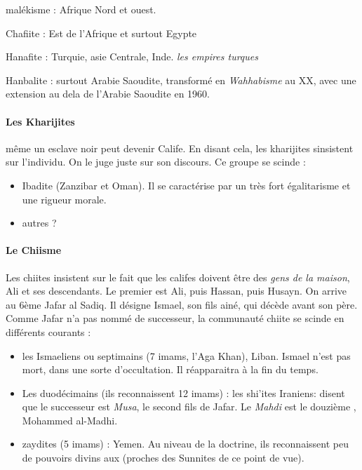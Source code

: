 \bi 
\item  malékisme : Afrique Nord et ouest.
\item Chafiite : Est de l'Afrique et surtout Egypte 
\item Hanafite : Turquie, asie Centrale, Inde. \textit{les empires turques}
\item Hanbalite : surtout Arabie Saoudite, transformé en \textit{Wahhabisme} au XX, avec une extension au dela de l'Arabie Saoudite en 1960.
\ei 

\paragraph{Les Kharijites} même un esclave noir peut devenir Calife. En disant cela, les kharijites sinsistent sur l'individu. On le juge juste sur son discours. 
Ce groupe se scinde : 
\begin{itemize}
\item Ibadite (Zanzibar et Oman). Il se caractérise par un très fort égalitarisme et une rigueur morale.
\item autres ? 
\end{itemize}

\paragraph{Le Chiisme} Les chiites insistent sur le fait que les califes doivent être des \textit{gens de la maison}, Ali et ses descendants. Le premier \imam est Ali, puis Hassan, puis Husayn. On arrive au 6ème \imam Jafar al Sadiq. Il désigne Ismael, son fils ainé, qui décède avant son père. Comme Jafar n'a pas nommé de successeur, la communauté chiite se scinde en différents courants : 
\begin{itemize}
\item les Ismaeliens ou septimains (7 imams, l'Aga Khan), Liban. Ismael n'est pas mort, dans une sorte d'occultation. Il réapparaitra à la fin du temps.  
\item Les duodécimains (ils reconnaissent 12 imams) : les shi'ites Iraniens: disent que le successeur est \textit{Musa}, le second fils de Jafar. Le \textit{Mahdi} est le douzième \imam, Mohammed al-Madhi.
\item zaydites (5 imams) : Yemen. Au niveau de la doctrine, ils reconnaissent peu de pouvoirs divins aux \imam  (proches des Sunnites de ce point de vue).
\end{itemize}



